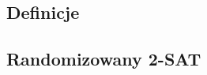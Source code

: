 {
\subsection{Definicje}



\makeatletter
{}
\makeatother
\graphicspath{{../probabil}}

\let\realsection\section
\let\realsubsection\subsection
\let\section\subsection
\let\subsection\subsubsection
\let\subsubsection\paragraph


\realsubsection{Randomizowany 2-SAT}
\label{2-sat-alg}

}


